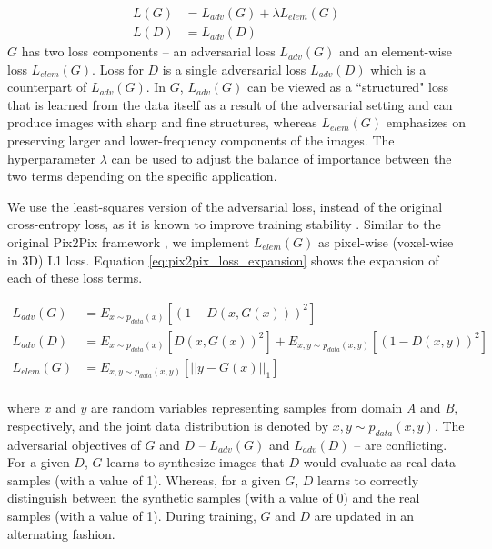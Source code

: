 \begin{equation}
    \begin{aligned}
    L(G) &= L_{adv}(G) + \lambda L_{elem}(G) \\
    L(D) &= L_{adv}(D)
    \end{aligned}
    \label{eq:pix2pix_loss_components}
\end{equation}
$G$ has two loss components -- an adversarial loss $L_{adv}(G)$ and an element-wise loss $L_{elem}(G)$. Loss for $D$ is a single adversarial loss $L_{adv}(D)$ which is a counterpart of $L_{adv}(G)$. In $G$, $L_{adv}(G)$ can be viewed as a ``structured" loss that is learned from the data itself as a result of the adversarial setting and can produce images with sharp and fine structures, whereas $L_{elem}(G)$ emphasizes on preserving larger and lower-frequency components of the images. The hyperparameter $\lambda$ can be used to adjust the balance of importance between the two terms depending on the specific application.

We use the least-squares version of the adversarial loss, instead of the original cross-entropy loss, as it is known to improve training stability \cite{mao2017least}. Similar to the original Pix2Pix framework \cite{isola2017image}, we implement $L_{elem}(G)$ as pixel-wise (voxel-wise in 3D) L1 loss. Equation \ref{eq:pix2pix_loss_expansion} shows the expansion of each of these loss terms.

\begin{equation}
    \begin{aligned}
    L_{adv}(G) &= E_{x \sim p_{data}(x)} [(1 - D(x, G(x)))^2]  \\
    L_{adv}(D) &= E_{x \sim p_{data}(x)} [D(x, G(x))^2] + E_{x,y \sim p_{data}(x,y)} [(1 - D(x,y))^2] \\
    L_{elem}(G) &= E_{x,y \sim p_{data}(x,y)} [|| y - G(x) ||_1]  \\
    \end{aligned}
    \label{eq:pix2pix_loss_expansion}
\end{equation}

where $x$ and $y$ are random variables representing samples from domain \textit{A} and \textit{B}, respectively, and the joint data distribution is denoted by $x,y \sim p_{data}(x,y)$. The adversarial objectives of $G$ and $D$ -- $L_{adv}(G)$ and $L_{adv}(D)$ -- are conflicting. For a given $D$, $G$ learns to synthesize images that $D$ would evaluate as real data samples (with a value of 1). Whereas, for a given $G$, $D$ learns to correctly distinguish between the synthetic samples (with a value of 0) and the real samples (with a value of 1). During training, $G$ and $D$ are updated in an alternating fashion.

